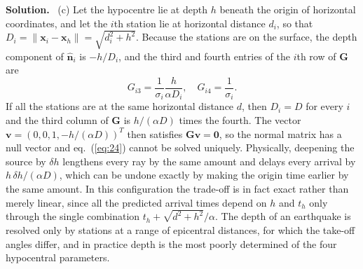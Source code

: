 \documentclass[a4paper,12pt]{paper}
\newenvironment{solution}{\par\noindent\textbf{Solution.}\ }{\par\medskip}
\begin{document}
\begin{solution}
(c) Let the hypocentre lie at depth $h$ beneath the origin of horizontal coordinates, and let
the $i$th station lie at horizontal distance $d_{i}$, so that
$D_{i}=\|\mathbf{x}_{i}-\mathbf{x}_{h}\|=\sqrt{d_{i}^{2}+h^{2}}$. Because the stations are on
the surface, the depth component of $\hat{\mathbf{n}}_{i}$ is $-h/D_{i}$, and the third and
fourth entries of the $i$th row of $\mathbf{G}$ are
\begin{equation}
G_{i3}=\frac{1}{\sigma_{i}}\frac{h}{\alpha D_{i}},\quad G_{i4}=\frac{1}{\sigma_{i}}.
\label{eq:25}
\end{equation}
If all the stations are at the same horizontal distance $d$, then $D_{i}=D$ for every $i$ and
the third column of $\mathbf{G}$ is $h/(\alpha D)$ times the fourth. The vector
$\mathbf{v}=(0,0,1,-h/(\alpha D))^{T}$ then satisfies $\mathbf{G}\mathbf{v}=\mathbf{0}$, so the
normal matrix has a null vector and eq.~(\ref{eq:24}) cannot be solved uniquely. Physically,
deepening the source by $\delta h$ lengthens every ray by the same amount and delays every
arrival by $h\,\delta h/(\alpha D)$, which can be undone exactly by making the origin time
earlier by the same amount. In this configuration the trade-off is in fact exact rather than
merely linear, since all the predicted arrival times depend on $h$ and $t_{h}$ only through the
single combination $t_{h}+\sqrt{d^{2}+h^{2}}/\alpha$. The depth of an earthquake is resolved
only by stations at a range of epicentral distances, for which the take-off angles differ, and
in practice depth is the most poorly determined of the four hypocentral parameters.


\end{solution}
\end{document}
